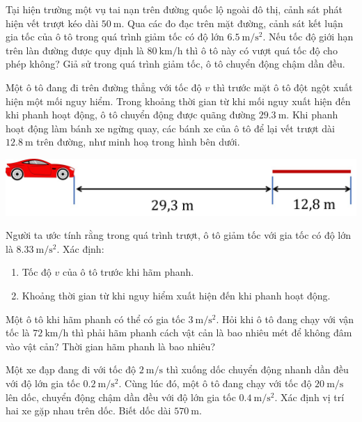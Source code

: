 \begin{ex}
	Tại hiện trường một vụ tai nạn trên đường quốc lộ ngoài đô thị, cảnh sát phát hiện vết trượt kéo dài $\SI{50}{\meter}$. Qua các đo đạc trên mặt đường, cảnh sát kết luận gia tốc của ô tô trong quá trình giảm tốc có độ lớn $\SI{6.5}{\meter/\second^2}$. Nếu tốc độ giới hạn trên làn đường được quy định là $\SI{80}{\kilo\meter/\hour}$ thì ô tô này có vượt quá tốc độ cho phép không? Giả sử trong quá trình giảm tốc, ô tô chuyển động chậm dần đều.
	\loigiai{}
\end{ex}
\begin{ex}
	Một ô tô đang đi trên đường thẳng với tốc độ $v$ thì trước mặt ô tô đột ngột xuất hiện một mối nguy hiểm. Trong khoảng thời gian từ khi mối nguy xuất hiện đến khi phanh hoạt động, ô tô chuyển động được quãng đường $\SI{29.3}{\meter}$. Khi phanh hoạt động làm bánh xe ngừng quay, các bánh xe của ô tô để lại vết trượt dài $\SI{12.8}{\meter}$ trên đường, như minh hoạ trong hình bên dưới.
	\begin{center}
		\includegraphics[width=0.5\linewidth]{figs/BAI7-2}
	\end{center}
	Người ta ước tính rằng trong quá trình trượt, ô tô giảm tốc với gia tốc có độ lớn là $\SI{8.33}{\meter/\second^2}$. Xác định:
	\begin{enumerate}[label=\alph*)]
		\item Tốc độ $v$ của ô tô trước khi hãm phanh.
		\item Khoảng thời gian từ khi nguy hiểm xuất hiện đến khi phanh hoạt động.
	\end{enumerate}
	\loigiai{}
\end{ex}
\begin{ex}
	Một ô tô khi hãm phanh có thể có gia tốc $\SI{3}{\meter/\second^2}$. Hỏi khi ô tô đang chạy với vận tốc là $\SI{72}{\kilo\meter/\hour}$ thì phải hãm phanh cách vật cản là bao nhiêu mét để không đâm vào vật cản? Thời gian hãm phanh là bao nhiêu?
	\loigiai{}
\end{ex}
\begin{ex}
	Một xe đạp đang đi với tốc độ $\SI{2}{\meter/\second}$ thì xuống dốc chuyển động nhanh dần đều với độ lớn gia tốc $\SI{0.2}{\meter/\second^2}$. Cùng lúc đó, một ô tô đang chạy với tốc độ $\SI{20}{\meter/\second}$ lên dốc,
	chuyển động chậm dần đều với độ lớn gia tốc $\SI{0.4}{\meter/\second^2}$. Xác định vị trí hai xe gặp nhau trên dốc. Biết dốc dài $\SI{570}{\meter}$.
\end{ex}
